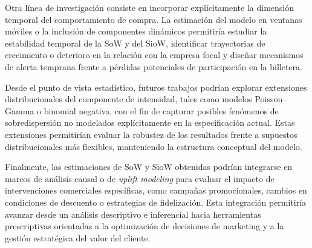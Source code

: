 Otra línea de investigación consiste en incorporar explícitamente la dimensión temporal del comportamiento de compra. La estimación del modelo en ventanas móviles o la inclusión de componentes dinámicos permitiría estudiar la estabilidad temporal de la SoW y del SioW, identificar trayectorias de crecimiento o deterioro en la relación con la empresa focal y diseñar mecanismos de alerta temprana frente a pérdidas potenciales de participación en la billetera.

Desde el punto de vista estadístico, futuros trabajos podrían explorar extensiones distribucionales del componente de intensidad, tales como modelos Poisson--Gamma o binomial negativa, con el fin de capturar posibles fenómenos de sobredispersión no modelados explícitamente en la especificación actual. Estas extensiones permitirían evaluar la robustez de los resultados frente a supuestos distribucionales más flexibles, manteniendo la estructura conceptual del modelo.

Finalmente, las estimaciones de SoW y SioW obtenidas podrían integrarse en marcos de análisis causal o de \emph{uplift modeling} para evaluar el impacto de intervenciones comerciales específicas, como campañas promocionales, cambios en condiciones de descuento o estrategias de fidelización. Esta integración permitiría avanzar desde un análisis descriptivo e inferencial hacia herramientas prescriptivas orientadas a la optimización de decisiones de marketing y a la gestión estratégica del valor del cliente.
